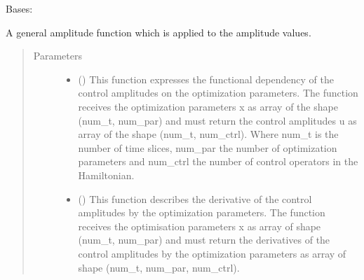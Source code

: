 \documentclass[letterpaper,10pt,english]{sphinxmanual}
\begin{document}
\begin{fulllineitems}
\label{\detokenize{qsim:qsim.amplitude_functions.CustomAmpFunc}}
Bases: {\hyperref[\detokenize{qsim:qsim.amplitude_functions.AmplitudeFunction}]{}}

A general amplitude function which is applied to the amplitude
values.
\begin{quote}\begin{description}
\item[{Parameters}] \leavevmode\begin{itemize}
\item {} 
 () \textendash{} This function expresses the functional dependency of the control
amplitudes on the optimization parameters. The function receives the
optimization parameters x as array of the shape (num\_t, num\_par) and
must return the control amplitudes u as array of the shape
(num\_t, num\_ctrl). Where num\_t is the number of time slices,
num\_par the number of optimization parameters and num\_ctrl the number
of control operators in the Hamiltonian.

\item {} 
 () \textendash{} This function describes the derivative of the control amplitudes by the
optimization parameters.
The function receives the optimisation parameters x as array
of shape (num\_t, num\_par) and must return the derivatives of the
control amplitudes by the optimization parameters as array of shape
(num\_t, num\_par, num\_ctrl).

\end{itemize}

\end{description}\end{quote}


\end{fulllineitems}
\end{document}
